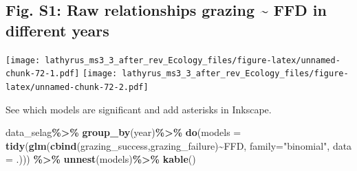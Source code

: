 \documentclass[
]{article}
\newenvironment{Shaded}{\begin{snugshade}}{\end{snugshade}}
\newcommand{\DataTypeTok}[1]{\textcolor[rgb]{0.13,0.29,0.53}{#1}}
\newcommand{\KeywordTok}[1]{\textcolor[rgb]{0.13,0.29,0.53}{\textbf{#1}}}
\newcommand{\NormalTok}[1]{#1}
\newcommand{\OperatorTok}[1]{\textcolor[rgb]{0.81,0.36,0.00}{\textbf{#1}}}
\newcommand{\StringTok}[1]{\textcolor[rgb]{0.31,0.60,0.02}{#1}}
\begin{document}
\hypertarget{fig.-s1-raw-relationships-grazing-ffd-in-different-years}{%
\subsection{Fig. S1: Raw relationships grazing \textasciitilde{} FFD in
different
years}\label{fig.-s1-raw-relationships-grazing-ffd-in-different-years}}

\texttt{[image: lathyrus\_ms3\_3\_after\_rev\_Ecology\_files/figure-latex/unnamed-chunk-72-1.pdf]}
\texttt{[image: lathyrus\_ms3\_3\_after\_rev\_Ecology\_files/figure-latex/unnamed-chunk-72-2.pdf]}

See which models are significant and add asterisks in Inkscape.

\begin{Shaded}
\begin{Highlighting}[]
\NormalTok{data\_selag}\OperatorTok{\%\textgreater{}\%}
\StringTok{  }\KeywordTok{group\_by}\NormalTok{(year)}\OperatorTok{\%\textgreater{}\%}
\StringTok{  }\KeywordTok{do}\NormalTok{(}\DataTypeTok{models =} \KeywordTok{tidy}\NormalTok{(}\KeywordTok{glm}\NormalTok{(}\KeywordTok{cbind}\NormalTok{(grazing\_success,grazing\_failure)}\OperatorTok{\textasciitilde{}}\NormalTok{FFD,}
                       \DataTypeTok{family=}\StringTok{"binomial"}\NormalTok{, }\DataTypeTok{data =}\NormalTok{ .))) }\OperatorTok{\%\textgreater{}\%}\StringTok{ }
\StringTok{  }\KeywordTok{unnest}\NormalTok{(models)}\OperatorTok{\%\textgreater{}\%}
\StringTok{  }\KeywordTok{kable}\NormalTok{()}
\end{Highlighting}
\end{Shaded}
\end{document}
